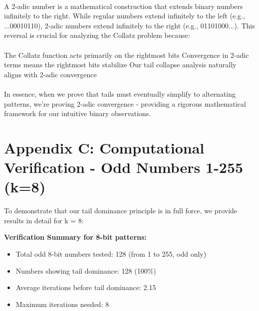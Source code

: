 \documentclass[10pt,letterpaper]{article}
\begin{document}
\paragraph{}
A 2-adic number is a mathematical construction that extends binary numbers infinitely to the right. While regular numbers extend infinitely to the left (e.g., ...00010110), 2-adic numbers extend infinitely to the right (e.g., 01101000...).
This reversal is crucial for analyzing the Collatz problem because:

\paragraph{}
The Collatz function acts primarily on the rightmost bits
Convergence in 2-adic terms means the rightmost bits stabilize
Our tail collapse analysis naturally aligns with 2-adic convergence

\paragraph{}
In essence, when we prove that tails must eventually simplify to alternating patterns, we're proving 2-adic convergence - providing a rigorous mathematical framework for our intuitive binary observations.

\newpage

\section*{Appendix C: Computational Verification - Odd Numbers 1-255 (k=8) }

\vspace{1em}

To demonstrate that our tail dominance principle is in full force, we provide results in detail for k = 8:

\vspace{1em}

\textbf{Verification Summary for 8-bit patterns:}

\vspace{1em}

\begin{itemize}
    \item Total odd 8-bit numbers tested: 128 (from 1 to 255, odd only)

    \item Numbers showing tail dominance: 128 (100\%)
    
    \item Average iterations before tail dominance: 2.15
    
    \item Maximum iterations needed: 8

\end{itemize}
\end{document}
